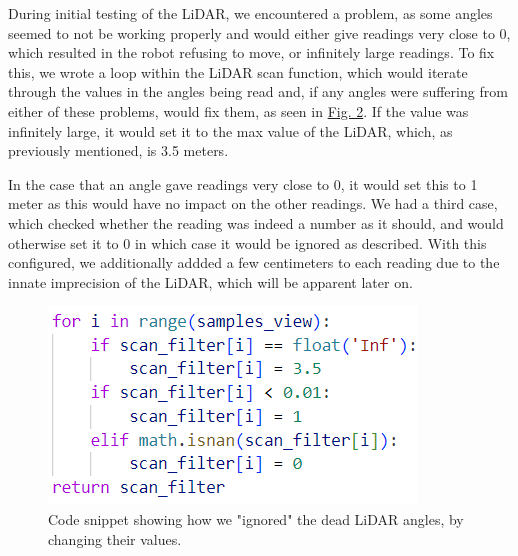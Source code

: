 \documentclass[conference]{IEEEtran}
\begin{document}
During initial testing of the LiDAR, we encountered a problem, as some angles seemed to not be working properly and would either give readings very close to 0, which resulted in the robot refusing to move, or infinitely large readings.
To fix this, we wrote a loop within the LiDAR scan function, which would iterate through the values in the angles being read and, if any angles were suffering from either of these problems, would fix them, as seen in \href{sec:lidar}{Fig. 2}.
If the value was infinitely large, it would set it to the max value of the LiDAR, which, as previously mentioned, is 3.5 meters.

In the case that an angle gave readings very close to 0, it would set this to 1 meter as this would have no impact on the other readings.
We had a third case, which checked whether the reading was indeed a number as it should, and would otherwise set it to 0 in which case it would be ignored as described.
With this configured, we additionally addded a few centimeters to each reading due to the innate imprecision of the LiDAR, which will be apparent later on.
\begin{figure}[htbp]
    \centerline{\includegraphics[width=0.8\columnwidth\hspace{-0.5cm}]{Pictures/LiDARhvid.png}}
    \caption{Code snippet showing how we "ignored" the dead LiDAR angles, by changing their values.}
    \label{sec:lidar}
    \end{figure}
\end{document}
